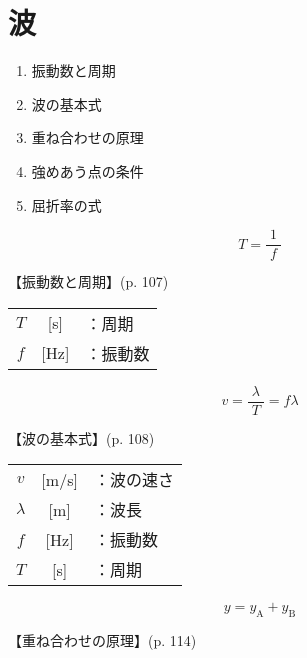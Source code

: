 \documentclass[10pt]{jarticle}
\begin{document}
\addtocounter{page}{-1}
\thispagestyle{empty}
\tableofcontents



\newpage
\addtocounter{page}{-1}
\thispagestyle{empty}
\section{波}

\begin{enumerate}
\small
\itemsep-4mm
\item 振動数と周期\\
\item 波の基本式\\
\item 重ね合わせの原理\\
\item 強めあう点の条件\\
\item 屈折率の式\\
\end{enumerate}




\newpage
\[
T = \frac{1}{\; f \;}
\]


\vskip3mm
【振動数と周期】{\footnotesize (p. 107)}

\begin{tabular}{ccl}
$T$	&[s]	&：周期 \\
$f$	& [Hz]	&：振動数
\end{tabular}

\newpage



\[
v = \frac{\lambda}{\; T \;} = f \lambda
\]


\vskip3mm
【波の基本式】{\footnotesize (p. 108)}

\begin{tabular}{ccl}
$v$	& [m/s]	&：波の速さ\\
$\lambda$	& [m]	&：波長\\
$f$	& [Hz]	&：振動数\\
$T$	&[s]	&：周期
\end{tabular}

\newpage




\[
y = y_\mathrm{A} + y_\mathrm{B}
\]


\vskip3mm
【重ね合わせの原理】{\footnotesize (p. 114)}
\end{document}
